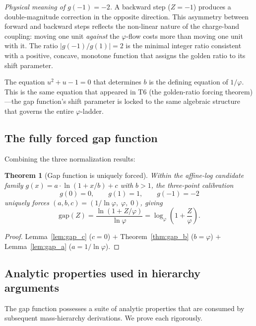\documentclass[11pt,a4paper]{article}
\newtheorem{theorem}{Theorem}[section]
\theoremstyle{definition}
\theoremstyle{remark}
\newcommand{\phig}{\varphi}
\newcommand{\Zidx}{Z}
\begin{document}
\noindent
\textit{Physical meaning of $g(-1) = -2$.}\quad
A backward step ($\Zidx = -1$) produces a double-magnitude correction in the
opposite direction.  This asymmetry between forward and backward steps
reflects the non-linear nature of the charge-band coupling: moving one unit
\emph{against} the $\phig$-flow costs more than moving one unit with it.
The ratio $|g(-1)/g(1)| = 2$ is the minimal integer ratio consistent with
a positive, concave, monotone function that assigns the golden ratio to its
shift parameter.

The equation $u^2 + u - 1 = 0$ that determines $b$ is the defining equation
of $1/\phig$.  This is the same equation that appeared in T6 (the golden-ratio
forcing theorem)---the gap function's shift parameter is locked to the same
algebraic structure that governs the entire $\phig$-ladder.

\subsection{The fully forced gap function}

Combining the three normalization results:

\begin{theorem}[Gap function is uniquely forced]
\label{thm:gap_forced}
Within the affine-log candidate family $g(x) = a \cdot \ln(1 + x/b) + c$
with $b > 1$, the three-point calibration
\begin{equation}
  g(0) = 0, \qquad g(1) = 1, \qquad g(-1) = -2
  \label{eq:gap_calibration}
\end{equation}
uniquely forces $(a, b, c) = (1/\ln\phig,\; \phig,\; 0)$, giving
\begin{equation}
  \boxed{\mathrm{gap}(\Zidx)
  = \frac{\ln(1 + \Zidx/\phig)}{\ln\phig}
  = \log_\phig\!\left(1 + \frac{\Zidx}{\phig}\right).}
  \label{eq:gap_forced}
\end{equation}
\end{theorem}

\begin{proof}
Lemma~\ref{lem:gap_c} ($c = 0$)
$+$ Theorem~\ref{thm:gap_b} ($b = \phig$)
$+$ Lemma~\ref{lem:gap_a} ($a = 1/\ln\phig$).
\end{proof}

\subsection{Analytic properties used in hierarchy arguments}

The gap function possesses a suite of analytic properties that are consumed by
subsequent mass-hierarchy derivations.  We prove each rigorously.
\end{document}
